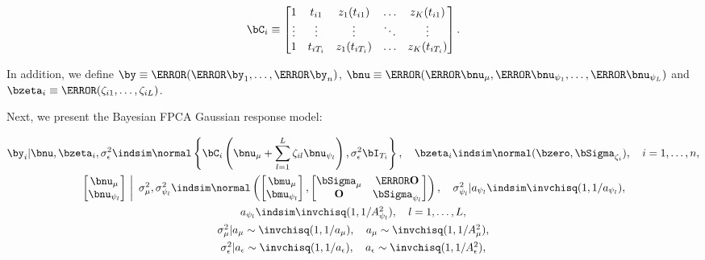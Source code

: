 \documentclass[ba]{imsart}
\numberwithin{equation}{section}
\theoremstyle{plain}
\def\sigsqeps{\sigma^2_{\epsilon}}
\def\aeps{a_{\epsilon}}
\def\Asqeps{A_{\epsilon}^2}
\def\sigsqmu{\sigma^2_{\mu}}
\def\amu{a_{\mu}}
\def\Asqmu{A_{\mu}^2}
\def\numu{\bnu_\mu}
\newcommand\nupsi[1]{\bnu_{\psi_{#1}}}
\newcommand\sigsqpsi[1]{\sigma^2_{\psi_{#1}}}
\newcommand\apsi[1]{a_{\psi_{#1}}}
\newcommand\Asqpsi[1]{A_{\psi_{#1}}^2}
\begin{document}
\begin{equation}
	\bC_i \equiv \begin{bmatrix}
		1 & t_{i1} & z_1 (t_{i1}) & \dots & z_K (t_{i1}) \\
		\vdots & \vdots & \vdots & \ddots & \vdots \\
		1 & t_{iT_i} & z_1 (t_{iT_i}) & \dots & z_K (t_{iT_i})
	\end{bmatrix}.
\label{C_mat}
\end{equation}

\noindent In addition, we define $\by \equiv \T{(\T{\by_1}, \dots, \T{\by_n})}$, $\bnu \equiv \T{(\T{\numu}, \T{\nupsi{1}},
\dots, \T{\nupsi{L}})}$ and $\bzeta_i \equiv \T{(\zeta_{i1}, \dots, \zeta_{iL})}$.

Next, we present the Bayesian FPCA Gaussian response model:

\begin{equation}
\begin{gathered}
	\by_i | \bnu, \bzeta_i, \sigsqeps \indsim \normal \left\{
		\bC_i \left( \numu + \sum_{l=1}^L \zeta_{il} \nupsi{l} \right), \sigsqeps \bI_{T_i}
	\right\}, \quad
	\bzeta_i \indsim \normal (\bzero, \bSigma_{\zeta_i}), \quad
	i = 1, \dots, n, \\
	$$
	\left.\begin{bmatrix}
		\numu \\
		\nupsi{l}
	\end{bmatrix} \ \right| \ \sigsqmu, \sigsqpsi{l}
		\indsim
			\normal \left(
				\begin{bmatrix}
					\bmu_\mu \\
					\bmu_{\psi_l} \\
				\end{bmatrix},
				\begin{bmatrix}
					\bSigma_\mu & \T{\textbf{O}} \\
					\textbf{O} & \bSigma_{\psi_l}
				\end{bmatrix}
			\right), \quad
	\sigsqpsi{l} | \apsi{l} \indsim \invchisq (1, 1/\apsi{l}), \\
	$$
	\apsi{l} \indsim \invchisq (1, 1/\Asqpsi{l}), \quad l = 1, \dots, L, \\
	$$
	\sigsqmu | \amu \sim \invchisq (1, 1/\amu), \quad \amu \sim \invchisq(1, 1/\Asqmu), \\
	$$
	\sigsqeps | \aeps \sim \invchisq (1, 1/\aeps), \quad \aeps \sim \invchisq(1, 1/\Asqeps),
\end{gathered}
\label{bayes_fpca_mod}
\end{equation}
\end{document}
